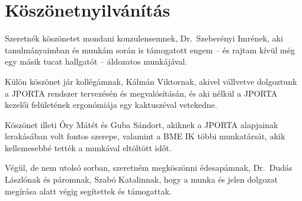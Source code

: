 \chapter*{Köszönetnyilvánítás}

Szeretnék köszönetet mondani konzulensemnek, Dr.~Szeberényi Imrének, aki tanulmányaimban és munkám során is támogatott engem -- és rajtam kívül még egy másik tucat hallgatót -- áldozatos munkájával.  

Külön köszönet jár kollégámnak, Kálmán Viktornak, akivel vállvetve dolgoztunk a JPORTA rendszer tervezésén és megvalósításán, és aki nélkül a JPORTA kezelői felületének ergonómiája egy kaktuszéval vetekedne.

Köszönet illeti Őry Mátét és Guba Sándort, akiknek a JPORTA alapjainak lerakásában volt fontos szerepe, valamint a BME IK többi munkatársát, akik kellemesebbé tették a munkával eltöltött időt.

Végül, de nem utolsó sorban, szeretném megköszönni édesapámnak, Dr.~Dudás Lászlónak és páromnak, Szabó Katalinnak, hogy a munka és jelen dolgozat megírása alatt végig segítettek és támogattak. 